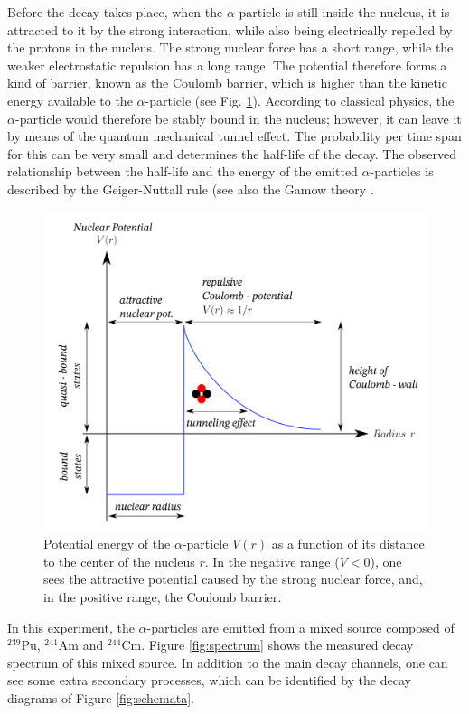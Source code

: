 Before the decay takes place, when the $\alpha$-particle is still inside the nucleus, it is attracted to it by the strong interaction, while also being electrically repelled by the protons in the nucleus. The strong nuclear force has a short range, while the weaker electrostatic repulsion has a long range. The potential therefore forms a kind of barrier, known as the Coulomb barrier, which is higher than the kinetic energy available to the $\alpha$-particle (see Fig. \ref{fig:coulomb-barrier}). According to classical physics, the $\alpha$-particle would therefore be stably bound in the nucleus; however, it can leave it by means of the quantum mechanical tunnel effect. The probability per time span for this can be very small and determines the half-life of the decay. The observed relationship between the half-life and the energy of the emitted $\alpha$-particles is described by the Geiger-Nuttall rule (see also the Gamow theory \cite{dewiki:240085809}.
\begin{figure}[h]
	\centering
	\includegraphics[width=0.6\linewidth]{img/tunneleffect_alpha_decay.png}
	\caption{Potential energy of the $\alpha$-particle $V(r)$ as a function of its distance to the center of the nucleus $r$. In the negative range ($V<0$), one sees the attractive potential caused by the strong nuclear force, and, in the positive range, the Coulomb barrier. \cite{img:coulombwall}}
	\label{fig:coulomb-barrier}
\end{figure}

In this experiment, the $\alpha$-particles are emitted from a mixed source composed of $^{239}$Pu, $^{241}$Am and $^{244}$Cm. Figure \ref{fig:spectrum} shows the measured decay spectrum of this mixed source. In addition to the main decay channels, one can see some extra secondary processes, which can be identified by the decay diagrams of Figure \ref{fig:schemata}.
\newpage

